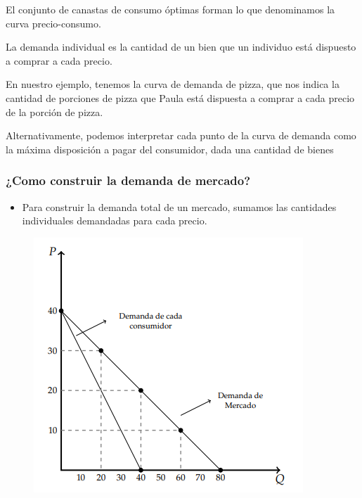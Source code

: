 \documentclass{beamer}
\begin{document}
\begin{frame}
  \begin{boxA}
    \begin{center}
      El conjunto de canastas de consumo óptimas forman lo que denominamos la curva precio-consumo.
    \end{center}
  \end{boxA}

  \begin{boxA}
    \begin{center}
      La demanda individual es la cantidad de un bien que un individuo está dispuesto a comprar a cada precio.
    \end{center}
  \end{boxA}
  \begin{center}
    En nuestro ejemplo, tenemos la curva de demanda de pizza, que nos indica la cantidad de porciones de pizza que Paula está dispuesta a comprar a cada precio de la porción de pizza.
  \end{center}
  \begin{boxA}
    \begin{center}
      Alternativamente, podemos interpretar cada punto de la curva de demanda como la máxima disposición a pagar del consumidor, dada una cantidad de bienes
    \end{center}
  \end{boxA}
\end{frame}

\begin{frame}
  \frametitle{¿Como construir la demanda de mercado?}
  \begin{itemize}
    \item Para construir la demanda total de un mercado, sumamos las cantidades individuales demandadas para cada precio.
  \end{itemize}
  \begin{figure}[H]
    \centering
    \includegraphics[scale=0.8]{../Figures/C10.2.png}      
  \end{figure} 
\end{frame}
\end{document}
